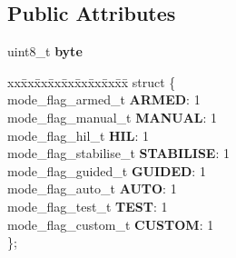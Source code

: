 \subsection*{Public Attributes}
\begin{DoxyCompactItemize}
\item 
\hypertarget{unionmav__mode__t_a1dca0d929fc4ff584404c4db0252839f}{uint8\+\_\+t {\bfseries byte}}\label{unionmav__mode__t_a1dca0d929fc4ff584404c4db0252839f}

\item 
\hypertarget{unionmav__mode__t_a1b88ba517444d494de425429a6a3e920}{\begin{tabbing}
xx\=xx\=xx\=xx\=xx\=xx\=xx\=xx\=xx\=\kill
struct \{\\
\hypertarget{structmav__mode__t_1_1@0_a6f8d2d78b7ff5f8c5ee3a160a883f070}{\>mode\_flag\_armed\_t {\bfseries ARMED}: 1\\
\hypertarget{structmav__mode__t_1_1@0_ac5d0a9bea4dbe1c32ec05c89fc547dfd}{\>mode\_flag\_manual\_t {\bfseries MANUAL}: 1\\
\hypertarget{structmav__mode__t_1_1@0_a7154a6eaba80a9471c5b5b1fce50ec9b}{\>mode\_flag\_hil\_t {\bfseries HIL}: 1\\
\hypertarget{structmav__mode__t_1_1@0_a6f421977d31e81daa14669453caee0b8}{\>mode\_flag\_stabilise\_t {\bfseries STABILISE}: 1\\
\hypertarget{structmav__mode__t_1_1@0_aea37069043299a04c943c27165a6cc9d}{\>mode\_flag\_guided\_t {\bfseries GUIDED}: 1\\
\hypertarget{structmav__mode__t_1_1@0_ad7ac6f39cd33d9b0c71c8f932d68311e}{\>mode\_flag\_auto\_t {\bfseries AUTO}: 1\\
\hypertarget{structmav__mode__t_1_1@0_a3ded7d6d8a91ecea063310dea02b14f0}{\>mode\_flag\_test\_t {\bfseries TEST}: 1\\
\hypertarget{structmav__mode__t_1_1@0_a85626135764f2577e251e1dc2c5a249b}{\>mode\_flag\_custom\_t {\bfseries CUSTOM}: 1\\
\}; }\label{unionmav__mode__t_a1b88ba517444d494de425429a6a3e920}
\\

}}}}}}}
\end{tabbing}}
\end{DoxyCompactItemize}
